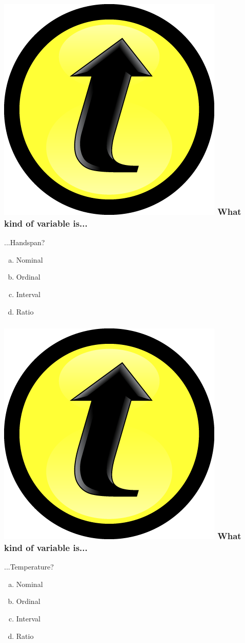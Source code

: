 \documentclass[handout]{beamer}
\begin{document}
\begin{frame}
\frametitle{\includegraphics[scale = 0.05]{./images/clicker} \hfill What kind of variable is...}
...Handspan?
	\begin{enumerate}[(a)]
\item Nominal
\item Ordinal
\item Interval
\item Ratio
\end{enumerate}
\end{frame}

\begin{frame}
\frametitle{\includegraphics[scale = 0.05]{./images/clicker} \hfill What kind of variable is...}
...Temperature?
	\begin{enumerate}[(a)]
\item Nominal
\item Ordinal
\item Interval
\item Ratio
\end{enumerate}
\end{frame}
\end{document}
